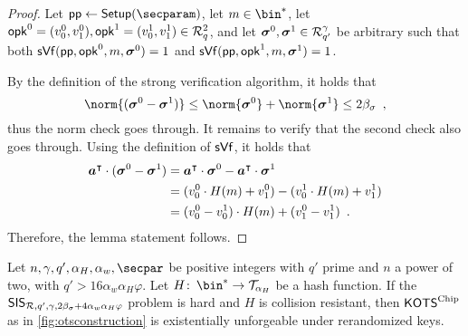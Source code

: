 \begin{proof}
  Let $\params\gets\setup(\secparam)$, let $m\in\bin^*$, let $\mathsf{opk}^0=(v^0_0,v^0_1),\mathsf{opk}^1=(v^1_0,v^1_1)\in \mathcal{R}^2_q$, and let $\boldsymbol{\sigma}^0,\boldsymbol{\sigma}^1 \in \mathcal{R}_{q'}^\gamma$ be arbitrary such that both $\mathsf{sVf}(\mathsf{pp},\mathsf{opk}^0,m,\boldsymbol{\sigma}^0)=1$ and $\mathsf{sVf}(\mathsf{pp},\mathsf{opk}^1,m,\boldsymbol{\sigma}^1)=1$.
  
  By the definition of the strong verification algorithm, it holds that
  \begin{equation*}
     \norm{(\vec{\sigma}^0-\vec{\sigma}^1)}
    \leq \norm{\vec{\sigma}^0}+\norm{\vec{\sigma}^1}
    \leq 2\beta_\sigma\enspace,
  \end{equation*}
  thus the norm check goes through.
  It remains to verify that the second check also goes through.
  Using the definition of $\mathsf{sVf}$, it holds that
  \begin{align*}
     \boldsymbol{a}^\intercal\cdot (\boldsymbol{\sigma}^0-\boldsymbol{\sigma}^1)
    ={}& \boldsymbol{a}^\intercal\cdot \boldsymbol{\sigma}^0- \boldsymbol{a}^\intercal\cdot\boldsymbol{\sigma}^1\\
    ={}& (v^0_0\cdot H(m) + v^0_1) - (v^1_0\cdot H(m) + v^1_1)\\
    ={}& (v^0_0-v^1_0)\cdot H(m) + (v^0_1-v^1_1)\enspace.
  \end{align*}
  Therefore, the lemma statement follows.
\end{proof}


\begin{lemma}\label{lem:kots_sis}
  Let $n,\otspkkeylen,q',\alpha_H,\alpha_w,\secpar$ be positive integers with $q'$ prime and $n$ a power of two, with $q' > 16 \alpha_w \alpha_H\varphi$.
  Let $H\colon\, \bin^* \to \tern_{\alpha_H}$ be a hash function.
  If the $\mathsf{SIS}_{\mathcal{R},q',\gamma,2\beta_\sigma + 4\alpha_w\alpha_H\varphi}$ problem is hard and $H$ is collision resistant, then $\mathsf{KOTS}^{\textup{Chip}}$ as in \autoref{fig:otsconstruction} is existentially unforgeable under rerandomized keys.
\end{lemma}

